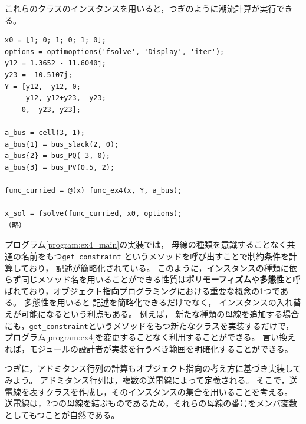 \documentclass[tombow,dvipdfmx]{corona-a5-1.1}
\begin{document}
{\begin{例}[母線の実装の分離]

これらのクラスのインスタンスを用いると，つぎのように潮流計算が実行できる。

\smallskip
\begin{PROGRAMA}[count,title={main\_ex4.m}]\label{program:ex4_main}
\begin{verbatim}
x0 = [1; 0; 1; 0; 1; 0];
options = optimoptions('fsolve', 'Display', 'iter');
y12 = 1.3652 - 11.6040j;
y23 = -10.5107j;
Y = [y12, -y12, 0;
    -y12, y12+y23, -y23;
    0, -y23, y23];

a_bus = cell(3, 1);
a_bus{1} = bus_slack(2, 0);
a_bus{2} = bus_PQ(-3, 0);
a_bus{3} = bus_PV(0.5, 2);

func_curried = @(x) func_ex4(x, Y, a_bus);

x_sol = fsolve(func_curried, x0, options);
（略）
\end{verbatim}
\end{PROGRAMA}

プログラム\ref{program:ex4_main}の実装では，
母線の種類を意識することなく共通の名前をもつ\verb|get_constraint|
というメソッドを呼び出すことで制約条件を計算しており，
記述が簡略化されている。
このように，インスタンスの種類に依らず同じメソッド名を用いることができる性質は\textbf{ポリモーフィズム}や\textbf{多態性}と呼ばれており，オブジェクト指向プログラミングにおける重要な概念の1つである。
多態性を用いると
記述を簡略化できるだけでなく，
インスタンスの入れ替えが可能になるという利点もある。
例えば，
新たな種類の母線を追加する場合にも，\verb|get_constraint|というメソッドをもつ新たなクラスを実装するだけで，プログラム\ref{program:ex4}を変更することなく利用することができる。
言い換えれば，モジュールの設計者が実装を行うべき範囲を明確化することができる。

つぎに，アドミタンス行列の計算もオブジェクト指向の考え方に基づき実装してみよう。
アドミタンス行列は，複数の送電線によって定義される。
そこで，送電線を表すクラスを作成し，そのインスタンスの集合を用いることを考える。
送電線は，2つの母線を結ぶものであるため，それらの母線の番号をメンバ変数としてもつことが自然である。


\end{例}}
\end{document}
